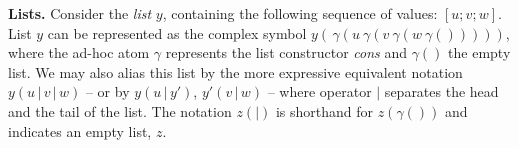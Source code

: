

\medskip
\noindent
\textbf{Lists.} Consider the \emph{list} $y$, containing the following sequence of values: 
$[u; v; w]$. 
List $y$ can be represented as the complex symbol
$y(\, \gamma(u~\gamma(v~\gamma(w~\gamma()))))$, 
where the ad-hoc atom $\gamma$ represents the list constructor \emph{cons} and $\gamma()$ the empty list.
We may also alias this list by the more expressive equivalent notation
$y(u\,|\,v\,|\,w)$
-- or by $y(u\,|\,y')$, $y'(v\,|\,w)$ --
where operator $\mid$ separates the head and the tail of the list.
The notation $z(|)$ is shorthand for $z(\gamma())$ and indicates an empty list, $z$.



